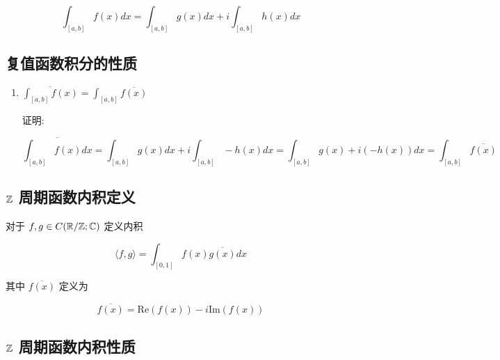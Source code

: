 \[
\int_{[a,b]}f(x) dx = \int_{[a,b]}g(x) dx + i\int_{[a,b]}h(x) dx
\]


\subsection{复值函数积分的性质}

\begin{enumerate}
    \item $\overline{\int_{[a,b]}f(x)} = \int_{[a,b]}\overline{f(x)}$

    证明:

    \[
    \overline{\int_{[a,b]}f(x) dx} = \int_{[a,b]}g(x) dx + i\int_{[a,b]}-h(x) dx = \int_{[a,b]} g(x) + i(-h(x))dx = \int_{[a,b]}\overline{f(x)}
    \]
\end{enumerate}

\subsection{$\mathbb{Z}$ 周期函数内积定义}

对于 $f,g \in C(\mathbb{R} / \mathbb{Z}; \mathbb{C})$ 定义内积 

\[
\langle f, g\rangle = \int_{[0,1]}f(x)\overline{g(x)} dx
\]

其中 $\overline{f(x)}$ 定义为 

\[
\overline{f(x)} = \mathrm{Re}(f(x)) - i\mathrm{Im}(f(x))
\]


\subsection{$\mathbb{Z}$ 周期函数内积性质}

